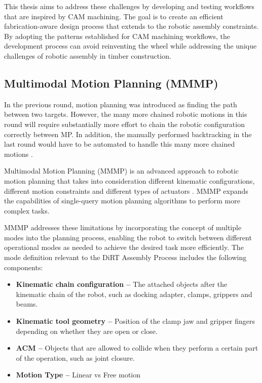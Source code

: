 This thesis aims to address these challenges by developing and testing workflows that are inspired by CAM machining. The goal is to create an efficient fabrication-aware design process that extends to the robotic assembly constraints. By adopting the patterns established for CAM machining workflows, the development process can avoid reinventing the wheel while addressing the unique challenges of robotic assembly in timber construction.

\vspace{2\baselineskip}
\subsection{Multimodal Motion Planning (MMMP)}
\label{subsection:exploration-3-multimodal-motion-planning-mmmp}

In the previous round, motion planning was introduced as finding the path between two targets. However, the many more chained robotic motions in this round  will require substantially more effort to chain the robotic configuration correctly between MP. In addition, the manually performed backtracking in the last round would have to be automated to handle this many more chained motions . 

Multimodal Motion Planning (MMMP) is an advanced approach to robotic motion planning that takes into consideration different kinematic configurations, different motion constraints and different types of actuators \parencite{hauserMultimodalMotionPlanning2010, hauserRandomizedMultimodalMotion2011}. MMMP expands the capabilities of single-query motion planning algorithms  to perform more complex tasks.

MMMP addresses these limitations by incorporating the concept of multiple modes into the planning process, enabling the robot to switch between different operational modes as needed to achieve the desired task more efficiently. The mode definition relevant to the DiRT Assembly Process includes the following components:

\begin{itemize}
	\item \textbf{Kinematic chain configuration --} The attached objects after the kinematic chain of the robot, such as docking adapter, clamps, grippers and beams.
	\item \textbf{Kinematic tool geometry --} Position of the clamp jaw and gripper fingers depending on whether they are open or close.
	\item \textbf{ACM --} Objects that are allowed to collide when they perform a certain part of the operation, such as joint closure.
	\item \textbf{Motion Type --} Linear vs Free motion
\end{itemize}

